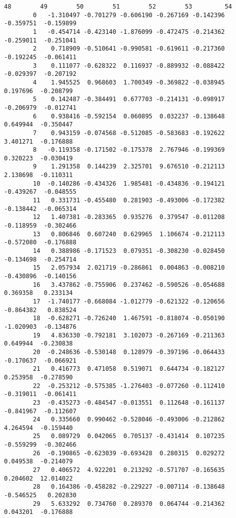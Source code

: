 \documentclass[11pt]{article}
\begin{document}
\begin{Verbatim}[commandchars=\\\{\}]
                   48        49        50        51        52        53         54  
        0   -1.310497 -0.701279 -0.606190 -0.267169 -0.142396 -0.359751  -0.159899  
        1   -0.454714 -0.423140 -1.876099 -0.472475 -0.214362 -0.259011  -0.251041  
        2    0.718909 -0.510641 -0.990581 -0.619611 -0.217360 -0.192245  -0.061411  
        3    0.111077 -0.628322  0.116937 -0.889932 -0.088422 -0.029397  -0.207192  
        4    1.945525  0.968603  1.700349 -0.369822 -0.038945  0.197696  -0.208799  
        5    0.142487 -0.384491  0.677703 -0.214131 -0.098917 -0.206979  -0.012741  
        6    0.938416 -0.592154  0.060895  0.032237 -0.138648  0.649944  -0.350447  
        7    0.943159 -0.074568 -0.512085 -0.583683 -0.192622  3.401271  -0.176888  
        8   -0.119358 -0.171502 -0.175378  2.767946 -0.199369  0.320223  -0.030419  
        9    1.291358  0.144239  2.325701  9.676510 -0.212113  2.138698  -0.110311  
        10  -0.140286 -0.434326  1.985481 -0.434836 -0.194121 -0.439267  -0.048555  
        11   0.331731 -0.455480  0.281903 -0.493006 -0.172382 -0.138442  -0.065314  
        12   1.407381 -0.283365  0.935276  0.379547 -0.011208 -0.118959  -0.302466  
        13   0.806846  0.607240  0.629965  1.106674 -0.212113 -0.572080  -0.176888  
        14   0.388986 -0.171523  0.079351 -0.308230 -0.028450 -0.134698  -0.254714  
        15   2.057934  2.021719 -0.286861  0.004863 -0.008210 -0.430896  -0.140156  
        16   3.437862 -0.755906  0.237462 -0.590526 -0.054688  0.369358   0.233134  
        17  -1.740177 -0.668084 -1.012779 -0.621322 -0.120656 -0.864382   0.838524  
        18  -0.628271 -0.726240  1.467591 -0.818074 -0.050190 -1.020903  -0.134876  
        19   4.836330 -0.792181  3.102073 -0.267169 -0.211363  0.649944  -0.230838  
        20  -0.248636 -0.530148  0.128979 -0.397196 -0.064433 -0.170637  -0.066921  
        21   0.416773  0.471058  0.519071  0.644734 -0.182127  0.253958  -0.278590  
        22  -0.253212 -0.575385 -1.276403 -0.077260 -0.112410 -0.319011  -0.061411  
        23  -0.435273 -0.484547 -0.013551  0.112648 -0.161137 -0.841967  -0.112607  
        24   0.335660  0.990462 -0.528046 -0.493006 -0.212862  4.264594  -0.159440  
        25   0.089729  0.042065  0.705137 -0.431414  0.107235 -0.559299  -0.302466  
        26  -0.190865 -0.623039 -0.693428  0.280315  0.029272  0.049538  -0.214079  
        27   0.406572  4.922201  0.213292 -0.571707 -0.165635  0.204602  12.014022  
        28   0.164386 -0.458282 -0.229227 -0.007114 -0.138648 -0.546525   0.202830  
        29   5.633292  0.734760  0.289370  0.064744 -0.214362  0.043201  -0.176888  

\end{Verbatim}
\end{document}
